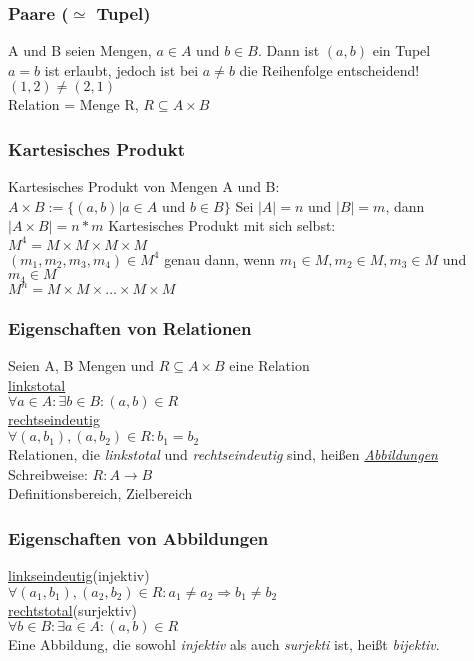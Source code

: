 \documentclass{beamer}
\begin{document}
	\begin{frame}
		\frametitle{Paare ($\simeq$ Tupel)}
		A und B seien Mengen, $a\in A$ und $b\in B$.
		Dann ist $(a,b)$ ein Tupel\\
		$a = b$ ist erlaubt, jedoch ist bei $ a\neq b$ die Reihenfolge entscheidend! $(1, 2) \neq (2, 1)$\\
		Relation = Menge R, $R\subseteq A\times B$
	\end{frame}
	\begin{frame}
		\frametitle{Kartesisches Produkt}
		Kartesisches Produkt von Mengen A und B:\\
		$A \times B := \{ (a, b)\vert a\in A$ und $b\in B\}$
		Sei $\lvert A\rvert = n$ und $\lvert B\rvert = m$, dann $\lvert A\times B\rvert = n * m$
		Kartesisches Produkt mit sich selbst:\\
		$M^{4} = M\times M\times M\times M$\\
		$(m_{1}, m_{2}, m_{3}, m_{4})\in M^{4}$ genau dann, wenn $m_{1}\in M, m_{2}\in M, m_{3}\in M$ und $m_{4}\in M$\\
		$M^{n} = M \times M\times\dots\times M\times M$
	\end{frame}
	\begin{frame}
		\frametitle{Eigenschaften von Relationen}
		Seien A, B Mengen und $R\subseteq A\times B$ eine Relation\\
		\underline{linkstotal}\\
		$\forall a\in A:\exists b\in B: (a,b)\in R$\\
		\underline{rechtseindeutig}\\
		$\forall (a, b_{1}), (a, b_{2})\in R: b_{1} = b_{2}$\\
		
		Relationen, die \emph{linkstotal} und \emph{rechtseindeutig} sind, heißen \emph{\underline{Abbildungen}}\\
		Schreibweise: $R: A\longrightarrow B$\\
		Definitionsbereich, Zielbereich %
	\end{frame}
	\begin{frame}
		\frametitle{Eigenschaften von Abbildungen}
		\underline{linkseindeutig}(injektiv)\\
		$\forall (a_{1}, b_{1}), (a_{2}, b_{2})\in R: a_{1} \neq a_{2}\Rightarrow b_{1} \neq b_{2}$\\%
		\underline{rechtstotal}(surjektiv)\\
		$\forall b\in B: \exists a\in A: (a, b)\in R$\\
		Eine Abbildung, die  sowohl \emph {injektiv} als auch \emph{surjekti} ist, heißt \emph{bijektiv}.
	\end{frame}
	
\end{document}
